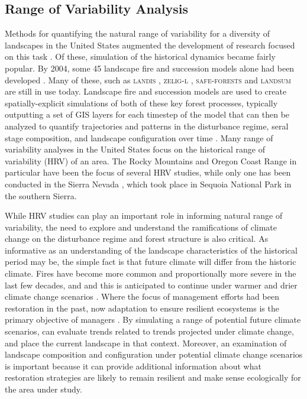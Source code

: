 \documentclass[12pt]{article}
\begin{document}
\begin{spacing}{1}
\subsection{Range of Variability Analysis}
Methods for quantifying the natural range of variability for a diversity of landscapes in the United States augmented the development of research focused on this task \citep{Landres1999}. Of these, simulation of the historical dynamics became fairly popular. By 2004, some 45 landscape fire and succession models alone had been developed \citep{Keane2004}. Many of these, such as \textsc{landis} \citep{He1999}, \textsc{zelig-l} \citep{Miller1999}, \textsc{safe-forests} \cite{Sessions1997} and \textsc{landsum} \citep{Keane2012} are still in use today. Landscape fire and succession models are used to create spatially-explicit simulations of both of these key forest processes, typically outputting a set of GIS layers for each timestep of the model that can then be analyzed to quantify trajectories and patterns in the disturbance regime, seral stage composition, and landscape configuration over time \citep{Keane2004}. Many range of variability analyses in the United States focus on the historical range of variability (HRV) of an area. The Rocky Mountains and Oregon Coast Range in particular have been the focus of several HRV studies, while only one has been conducted in the Sierra Nevada \citep{Miller1999}, which took place in Sequoia National Park in the southern Sierra. 

While HRV studies can play an important role in informing natural range of variability, the need to explore and understand the ramifications of climate change on the disturbance regime and forest structure is also critical. As informative as an understanding of the landscape characteristics of the historical period may be, the simple fact is that future climate will differ from the historic climate. Fires have become more common and proportionally more severe in the last few decades, and and this is anticipated to continue under warmer and drier climate change scenarios \citep{McKenzie2004,Westerling2007,Dale2001}. Where the focus of management efforts had been restoration in the past, now adaptation to ensure resilient ecosystems is the primary objective of managers \citep{Stephens2010}. By simulating a range of potential future climate scenarios, can evaluate trends related to trends projected under climate change, and place the current landscape in that context. Moreover, an examination of landscape composition and configuration under potential climate change scenarios is important because it can provide additional information about what restoration strategies are likely to remain resilient and make sense ecologically for the area under study. 


\end{spacing}
\end{document}
